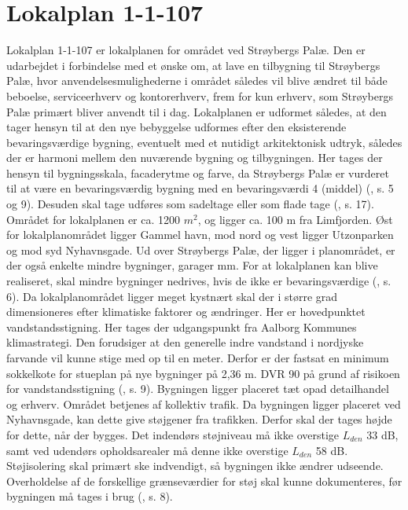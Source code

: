 \section{Lokalplan 1-1-107}
Lokalplan 1-1-107 er lokalplanen for området ved Strøybergs Palæ. Den er udarbejdet i forbindelse med et ønske om, at lave en tilbygning til Strøybergs Palæ, hvor anvendelsesmulighederne i området således vil blive ændret til både beboelse, serviceerhverv og kontorerhverv, frem for kun erhverv, som Strøybergs Palæ primært bliver anvendt til i dag. Lokalplanen er udformet således, at den tager hensyn til at den nye bebyggelse udformes efter den eksisterende bevaringsværdige bygning, eventuelt med et nutidigt arkitektonisk udtryk, således der er harmoni mellem den nuværende bygning og tilbygningen. Her tages der hensyn til bygningsskala, facaderytme og farve, da Strøybergs Palæ er vurderet til at være en bevaringsværdig bygning med en bevaringsværdi 4 (middel) (\citep{lokalplan}, s. 5 og 9). Desuden skal tage udføres som sadeltage eller som flade tage (\citep{lokalplan}, s. 17).
\newline
\newline
Området for lokalplanen er ca. 1200 $m^2$, og ligger ca. 100 m fra Limfjorden. Øst for lokalplanområdet ligger Gammel havn, mod nord og vest ligger Utzonparken og mod syd Nyhavnsgade. Ud over Strøybergs Palæ, der ligger i planområdet, er der også enkelte mindre bygninger, garager mm. For at lokalplanen kan blive realiseret, skal mindre bygninger nedrives, hvis de ikke er bevaringsværdige (\citep{lokalplan}, s. 6).
\newline \indent{     }  Da lokalplanområdet ligger meget kystnært skal der i større grad dimensioneres efter klimatiske faktorer og ændringer. Her er hovedpunktet vandstandsstigning. Her tages der udgangspunkt fra Aalborg Kommunes klimastrategi. Den forudsiger at den generelle indre vandstand i nordjyske farvande vil kunne stige med op til en meter. Derfor er der fastsat en minimum sokkelkote for stueplan på nye bygninger på 2,36 m. DVR 90 på grund af risikoen for vandstandsstigning (\citep{lokalplan}, s. 9).
\newline \indent{     }  Bygningen ligger placeret tæt opad detailhandel og erhverv. Området betjenes af kollektiv trafik. Da bygningen ligger placeret ved Nyhavnsgade, kan dette give støjgener fra trafikken. Derfor skal der tages højde for dette, når der bygges. Det indendørs støjniveau må ikke overstige $L_{den}$ 33 dB, samt ved udendørs opholdsarealer må denne ikke overstige $L_{den}$ 58 dB. Støjisolering skal primært ske indvendigt, så bygningen ikke ændrer udseende. Overholdelse af de forskellige grænseværdier for støj skal kunne dokumenteres, før bygningen må tages i brug (\citep{lokalplan}, s. 8).
